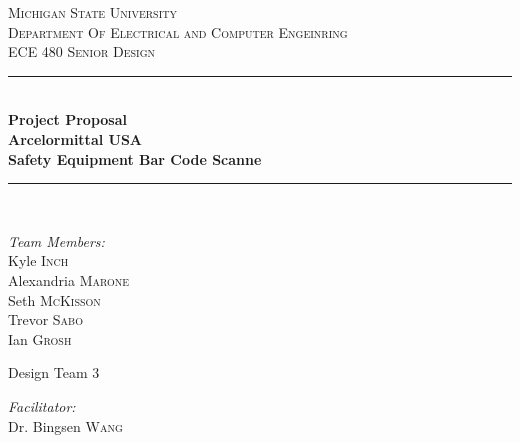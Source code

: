 \begin{titlepage}
		             
		\newcommand{\HRule}{\rule{\linewidth}{0.5mm}} %
		
		\center %
		
		
		\textsc{\LARGE Michigan State University}\\[0.5cm] %
		\textsc{\Large Department Of Electrical and Computer Engeinring}\\[0.5cm] %
		\textsc{\Large ECE 480 Senior Design}\\[0.5cm]
		
		
		\HRule \\[0.2cm]
		{ \huge \bfseries Project Proposal\\ Arcelormittal USA\\ Safety Equipment Bar Code Scanne}\\[0.2cm] %
		\HRule \\[1.5cm]
		
		\noindent
		\begin{minipage}[t]{0.3\textwidth}
			\begin{flushleft} \large
				\emph{Team Members:}\\
				Kyle \textsc{Inch}\\
				Alexandria \textsc{Marone}\\
				Seth \textsc{McKisson}\\
				Trevor \textsc{Sabo}\\
				Ian \textsc{Grosh}\\ %
			\end{flushleft}
		\end{minipage}%
		\begin{minipage}{0.3\textwidth}
			\centering
			{\LARGE Design Team 3}
		\end{minipage}
		\begin{minipage}[t]{0.3\textwidth}
			\begin{flushright} \large
				\emph{Facilitator:}\\  %
				Dr. Bingsen \textsc{Wang}
				

\end{flushright}
\end{minipage}
\end{titlepage}
